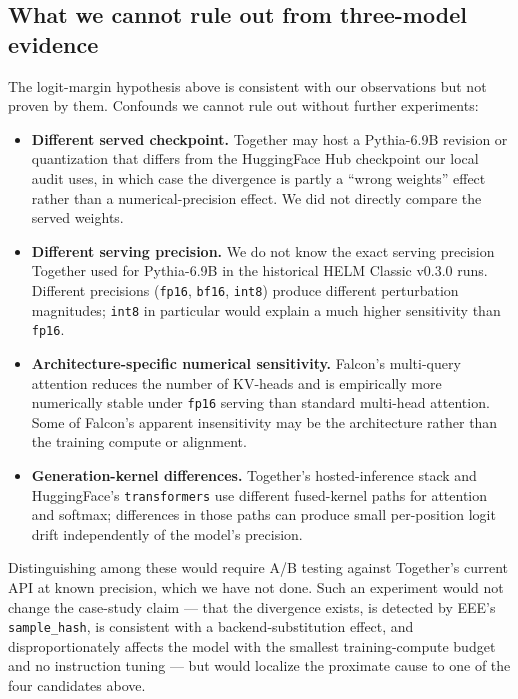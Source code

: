 \documentclass[11pt]{article}
\begin{document}
\subsection{What we cannot rule out from three-model evidence}
\label{sec:tr-pythia-confounds}

The logit-margin hypothesis above is consistent with our observations
  but not proven by them.
Confounds we cannot rule out without further experiments:

\begin{itemize}
  \item \textbf{Different served checkpoint.}
        Together may host a Pythia-6.9B revision or quantization that
        differs from the HuggingFace Hub checkpoint our local audit
        uses, in which case the divergence is partly a ``wrong
        weights'' effect rather than a numerical-precision effect.
        We did not directly compare the served weights.
  \item \textbf{Different serving precision.}
        We do not know the exact serving precision Together used for
        Pythia-6.9B in the historical HELM Classic v0.3.0 runs.
        Different precisions (\texttt{fp16}, \texttt{bf16},
        \texttt{int8}) produce different perturbation magnitudes;
        \texttt{int8} in particular would explain a much higher
        sensitivity than \texttt{fp16}.
  \item \textbf{Architecture-specific numerical sensitivity.}
        Falcon's multi-query attention reduces the number of KV-heads
        and is empirically more numerically stable under
        \texttt{fp16} serving than standard multi-head attention.
        Some of Falcon's apparent insensitivity may be the
        architecture rather than the training compute or alignment.
  \item \textbf{Generation-kernel differences.}
        Together's hosted-inference stack and HuggingFace's
        \texttt{transformers} use different fused-kernel paths for
        attention and softmax; differences in those paths can produce
        small per-position logit drift independently of the model's
        precision.
\end{itemize}

Distinguishing among these would require A/B testing against
  Together's current API at known precision, which we have not done.
Such an experiment would not change the case-study claim --- that the
  divergence exists, is detected by EEE's \texttt{sample\_hash}, is
  consistent with a backend-substitution effect, and disproportionately
  affects the model with the smallest training-compute budget and no
  instruction tuning --- but would localize the proximate cause to one
  of the four candidates above.
\end{document}
